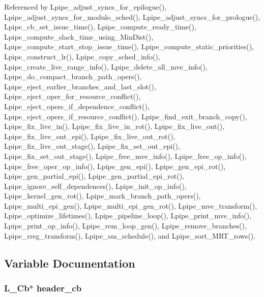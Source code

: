 Referenced by Lpipe\_\-adjust\_\-syncs\_\-for\_\-epilogue(), Lpipe\_\-adjust\_\-syncs\_\-for\_\-modulo\_\-sched(), Lpipe\_\-adjust\_\-syncs\_\-for\_\-prologue(), Lpipe\_\-cb\_\-set\_\-issue\_\-time(), Lpipe\_\-compute\_\-ready\_\-time(), Lpipe\_\-compute\_\-slack\_\-time\_\-using\_\-Min\-Dist(), Lpipe\_\-compute\_\-start\_\-stop\_\-issue\_\-time(), Lpipe\_\-compute\_\-static\_\-priorities(), Lpipe\_\-construct\_\-lr(), Lpipe\_\-copy\_\-sched\_\-info(), Lpipe\_\-create\_\-live\_\-range\_\-info(), Lpipe\_\-delete\_\-all\_\-mve\_\-info(), Lpipe\_\-do\_\-compact\_\-branch\_\-path\_\-opers(), Lpipe\_\-eject\_\-earlier\_\-branches\_\-and\_\-last\_\-slot(), Lpipe\_\-eject\_\-oper\_\-for\_\-resource\_\-conflict(), Lpipe\_\-eject\_\-opers\_\-if\_\-dependence\_\-conflict(), Lpipe\_\-eject\_\-opers\_\-if\_\-resource\_\-conflict(), Lpipe\_\-find\_\-exit\_\-branch\_\-copy(), Lpipe\_\-fix\_\-live\_\-in(), Lpipe\_\-fix\_\-live\_\-in\_\-rot(), Lpipe\_\-fix\_\-live\_\-out(), Lpipe\_\-fix\_\-live\_\-out\_\-epi(), Lpipe\_\-fix\_\-live\_\-out\_\-rot(), Lpipe\_\-fix\_\-live\_\-out\_\-stage(), Lpipe\_\-fix\_\-set\_\-out\_\-epi(), Lpipe\_\-fix\_\-set\_\-out\_\-stage(), Lpipe\_\-free\_\-mve\_\-info(), Lpipe\_\-free\_\-op\_\-info(), Lpipe\_\-free\_\-oper\_\-op\_\-info(), Lpipe\_\-gen\_\-epi(), Lpipe\_\-gen\_\-epi\_\-rot(), Lpipe\_\-gen\_\-partial\_\-epi(), Lpipe\_\-gen\_\-partial\_\-epi\_\-rot(), Lpipe\_\-ignore\_\-self\_\-dependences(), Lpipe\_\-init\_\-op\_\-info(), Lpipe\_\-kernel\_\-gen\_\-rot(), Lpipe\_\-mark\_\-branch\_\-path\_\-opers(), Lpipe\_\-multi\_\-epi\_\-gen(), Lpipe\_\-multi\_\-epi\_\-gen\_\-rot(), Lpipe\_\-mve\_\-transform(), Lpipe\_\-optimize\_\-lifetimes(), Lpipe\_\-pipeline\_\-loop(), Lpipe\_\-print\_\-mve\_\-info(), Lpipe\_\-print\_\-op\_\-info(), Lpipe\_\-rem\_\-loop\_\-gen(), Lpipe\_\-remove\_\-branches(), Lpipe\_\-rreg\_\-transform(), Lpipe\_\-sm\_\-schedule(), and Lpipe\_\-sort\_\-MRT\_\-rows().

\subsection{Variable Documentation}
\subsubsection{\setlength{\rightskip}{0pt plus 5cm}L\_\-Cb$\ast$ \bf{header\_\-cb}}\label{l__softpipe__int_8h_91e84fa9645e4d3beb7b8b6c150da74b}




